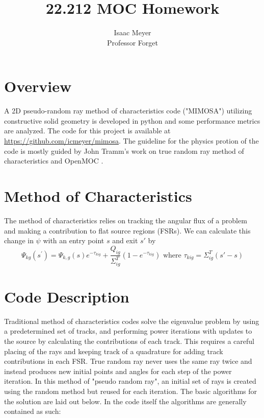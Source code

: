 \documentclass[10pt,letter]{article}
\begin{document}


\title{22.212 MOC Homework}

\author{Isaac Meyer\\
        Professor Forget}

 
\maketitle 

\section*{Overview}
A 2D pseudo-random ray method of characteristics code ("MIMOSA") utilizing constructive solid geometry is developed in python and some performance metrics are analyzed. The code for this project is available at \url{https://github.com/icmeyer/mimosa}. The guideline for the physics protion of the code is mostly guided by John Tramm's work on true random ray method of characteristics \cite{tramm_2017} and OpenMOC \cite{boyd_2014}.

\section*{Method of Characteristics}
The method of characteristics relies on tracking the angular flux of a problem and making a contribution to flat source regions (FSRs). We can calculate this change in $\psi$ with an entry point $s$ and exit $s'$ by  
\[\Psi _ { k g } \left( s ^ { \prime  } \right) = \Psi _ { k , g } \left( s \right) e ^ { - \tau _ { k i g } } + \frac { Q _ { i g } } { \Sigma _ { i g } ^ { T } } \left( 1 - e ^ { - \tau _ { k i g } } \right)\text{ where } \tau_{kig} = \Sigma_{ig}^T(s'-s)\]

\section{Code Description}
Traditional method of characteristics codes solve the eigenvalue problem by using a predetermined set of tracks, and performing power iterations with updates to the source by calculating the contributions of each track. This requires a careful placing of the rays and keeping track of a quadrature for adding track contributions in each FSR. True random ray never uses the same ray twice and instead produces new initial points and angles for each step of the power iteration. In this method of "pseudo random ray", an initial set of rays is created using the random method but reused for each iteration. The basic algorithms for the solution are laid out below. In the code itself the algorithms are generally contained as such:
\end{document}
